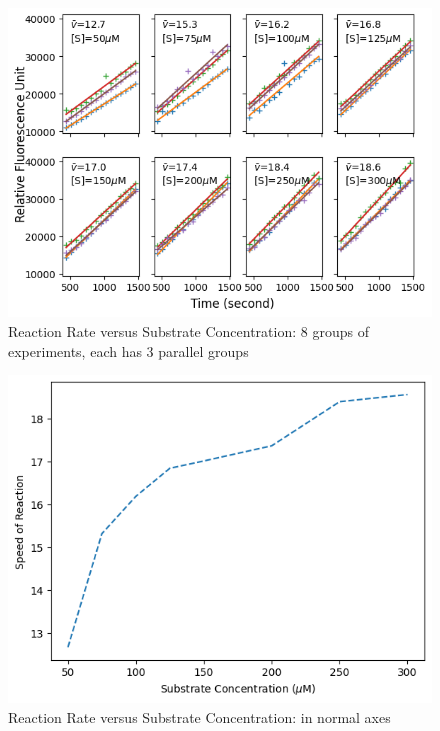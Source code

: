 \documentclass{report}
\begin{document}
\begin{figure}
    \centering
    \includegraphics[width=1\linewidth]{../Figures/substrate1.png}
    \caption{Reaction Rate versus Substrate Concentration: 8 groups of experiments, each has 3 parallel groups}
    \label{Reaction Rate versus Substrate Concentration: 8 groups of experiments}
\end{figure}

\begin{figure}
    \centering
    \includegraphics[width=1\linewidth]{../Figures/substrate2.png}
    \caption{Reaction Rate versus Substrate Concentration: in normal axes}
    \label{Reaction Rate versus Substrate Concentration: in normal axes}
\end{figure}
\end{document}
